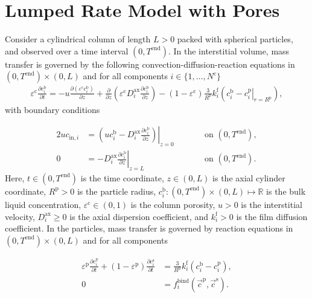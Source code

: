 \documentclass{article}
\begin{document}
\section*{Lumped Rate Model with Pores}
Consider a cylindrical column of length $L > 0$ packed with spherical particles, and observed over a time interval $(0, T^{\mathrm{end}})$.
In the interstitial volume, mass transfer is governed by the following convection-diffusion-reaction equations in $(0, T^\mathrm{end})\times (0, L)$ and for all components $i\in\{1, \dots, N^{\mathrm{c}} \}$
\begin{align}
\varepsilon^{\mathrm{c}} \frac{\partial c^{\mathrm{b}}_i}{\partial t} = - u \frac{\partial \left( \varepsilon^{\mathrm{c}} c^{\mathrm{b}}_i \right)}{\partial z} + \frac{\partial}{\partial z} \left( \varepsilon^{\mathrm{c}} D^{\mathrm{ax}}_{i} \frac{\partial c^{\mathrm{b}}_i}{\partial z} \right)- \left(1 - \varepsilon^{\mathrm{c}} \right) \frac{3}{R^{\mathrm{p}}} k^{\mathrm{f}}_{i} \left(c^{\mathrm{b}}_i - \left. c^{\mathrm{p}}_{i} \right|_{r = R^{\mathrm{p}}} \right),
\end{align}
with boundary conditions

\begin{alignat}{2}
u c_{\mathrm{in},i} &= \left.\left( u c^{\mathrm{b}}_i - D^{\mathrm{ax}}_{i} \frac{\partial c^{\mathrm{b}}_i}{\partial z}\right)\right|_{z=0} & &\qquad\text{on }(0, T^{\mathrm{end}}),\\
               0 &= - D^{\mathrm{ax}}_{i} \left. \frac{\partial c^{\mathrm{b}}_i}{\partial z} \right|_{z=L} & &\qquad\text{on }(0, T^{\mathrm{end}}).
\end{alignat}
Here, $t\in (0, T^{\mathrm{end}})$ is the time coordinate, $z\in (0, L)$ is the axial cylinder coordinate, $R^\mathrm{p}> 0$ is the particle radius, $c^{\mathrm{b}}_i\colon (0, T^\mathrm{end})\times (0, L) \mapsto \mathbb{R}$ is the bulk liquid concentration, $\varepsilon^{\mathrm{c}}\in (0, 1)$ is the column porosity, $u> 0$ is the interstitial velocity, $D^\mathrm{ax}_i\geq 0$ is the axial dispersion coefficient, and $k^\mathrm{f}_{i}> 0$ is the film diffusion coefficient.
In the particles, mass transfer is governed by reaction equations in $ (0, T^\mathrm{end}) \times (0, L)$ and for all components

\begin{align}

          \varepsilon^{\mathrm{p}}\frac{\partial c^{\mathrm{p}}_{i}}{\partial t}  + \left( 1 - \varepsilon^{\mathrm{p}}\right) \frac{\partial c^{\mathrm{s}}_{i}}{\partial t} 
          &=\frac{3}{R^{\mathrm{p}}} k^\mathrm{f}_{i} \left( c^{\mathrm{b}}_{i} - c^{\mathrm{p}}_{i} \right) ,\\

          0
          &= f^{\mathrm{bind}}_{i}\left( \vec{c}^{\mathrm{p}}, \vec{c}^{\mathrm{s}} \right).
\end{align}
\end{document}
